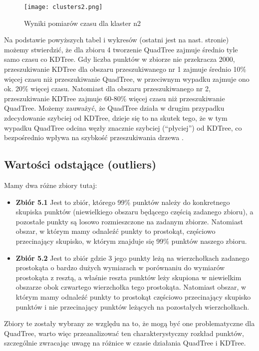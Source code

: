 \documentclass[a4paper, 12pt]{article}
\begin{document}
      \begin{figure}[h!]
      \centering
        \texttt{[image: clusters2.png]}
        \caption{Wyniki pomiarów czasu dla klaster n2}
      \end{figure}

      \noindent
      \quad Na podstawie powyższych tabel i wykresów (ostatni jest na nast. stronie) możemy stwierdzić, że dla zbioru 4 tworzenie QuadTree zajmuje średnio tyle samo czasu co KDTree. Gdy liczba punktów w zbiorze nie przekracza 2000, przeszukiwanie KDTree dla obszaru przeszukiwanego nr 1  zajmuje średnio 10\% więcej czasu niż przeszukiwanie QuadTree, w przeciwnym wypadku zajmuje ono ok. 20\% więcej czasu. Natomiast dla obszaru przeszukiwanego nr 2, przeszukiwanie KDTree zajmuje 60-80\%  więcej czasu niż przeszukiwanie QuadTree. Możemy zauważyć, że QuadTree działa w drugim przypadku zdecydowanie szybciej od KDTree, dzieje się to na skutek tego, że w tym wypadku QuadTree odcina węzły znacznie szybciej (“płyciej”) od KDTree, co bezpośrednio wpływa na szybkość przeszukiwania drzewa . 

    \subsection{Wartości odstające (outliers)}
      \quad Mamy dwa różne zbiory tutaj:

      \begin{itemize}
          \item \textbf{Zbiór 5.1} Jest to zbiór, którego 99\% punktów należy do konkretnego skupiska punktów (niewielkiego obszaru będącego częścią zadanego zbioru), a pozostałe punkty są losowo rozmieszczone na zadanym zbiorze. Natomiast obszar, w którym mamy odnaleźć punkty to prostokąt, częściowo przecinający skupisko, w którym znajduje się 99\% punktów naszego zbioru. 

          \item \textbf{Zbiór 5.2} Jest to zbiór gdzie 3 jego punkty leżą na wierzchołkach zadanego prostokąta o bardzo dużych wymiarach w porównaniu do wymiarów prostokąta z resztą, a właśnie reszta punktów leży skupiona w niewielkim obszarze obok czwartego wierzchołka tego prostokąta. Natomiast obszar, w którym mamy odnaleźć punkty to prostokąt częściowo przecinający skupisko punktów i nie przecinający punktów leżących na pozostałych wierzchołkach.
      \end{itemize}

      \noindent
      \quad Zbiory te zostały wybrany ze względu na to, że mogą być one problematyczne dla QuadTree, warto więc przeanalizować ten charakterystyczny rozkład punktów, szczególnie zwracając uwagę na różnice w czasie działania QuadTree i KDTree. 
\end{document}
